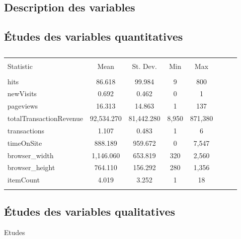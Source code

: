 \subsection{Description des variables}

\subsection{Études des variables quantitatives}

\begin{table}[!htbp] \centering 
  \caption{} 
  \label{} 
\begin{tabular}{@{\extracolsep{5pt}}lccccccc} 
\\[-1.8ex]\hline 
\hline \\[-1.8ex] 
Statistic & \multicolumn{1}{c}{Mean} & \multicolumn{1}{c}{St. Dev.} & \multicolumn{1}{c}{Min} & \multicolumn{1}{c}{Max} \\ 
\hline \\[-1.8ex] 
hits & 86.618 & 99.984 & 9 & 800 \\ 
newVisits & 0.692 & 0.462 & 0  & 1 \\ 
pageviews & 16.313 & 14.863 & 1  & 137 \\ 
totalTransactionRevenue & 92,534.270 & 81,442.280 & 8,950  & 871,380 \\ 
transactions & 1.107 & 0.483 & 1 & 6 \\ 
timeOnSite & 888.189 & 959.672 & 0  & 7,547 \\ 
browser\_width & 1,146.060 & 653.819 & 320 & 2,560 \\ 
browser\_height & 764.110 & 156.292 & 280  & 1,356 \\ 
itemCount & 4.019 & 3.252 & 1  & 18 \\ 
\hline \\[-1.8ex] 
\end{tabular} 
\end{table} 


\subsection{Études des variables qualitatives}

Etudes

